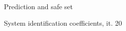 \begin{figure}[ht]
    \centering
      
    \caption{Prediction and safe set}
    \label{fig:xy_safeset}
\end{figure}

\begin{figure}[ht]
    \centering
      
    \caption{System identification coefficients, it. 20}
    \label{fig:sysIDcoeff}
\end{figure}
